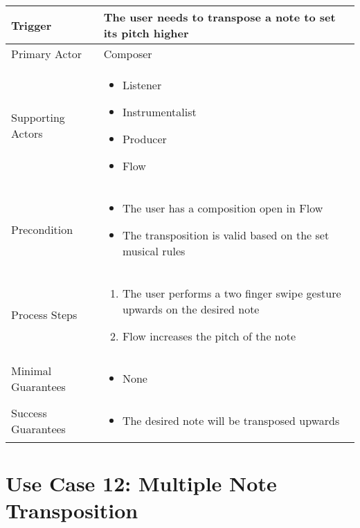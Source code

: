   \begin{tabularx}{\textwidth}{|X|X|}
  \hline
  Trigger & 
  The user needs to transpose a note to set its pitch higher \\
  \hline
  Primary Actor & 
  Composer \\
  \hline
  Supporting Actors & 
  \begin{itemize}
  \item Listener
  \item Instrumentalist
  \item Producer
  \item Flow
  \end{itemize} \\
  \hline
  Precondition & 
  \begin{itemize}
  \item The user has a composition open in Flow
  \item The transposition is valid based on the set musical rules
  \end{itemize} \\
  \hline
  Process Steps & 
  \begin{enumerate}
  \item The user performs a two finger swipe gesture upwards on the desired note
  \item Flow increases the pitch of the note
  \end{enumerate} \\
  \hline
  Minimal Guarantees & 
  \begin{itemize}
    \item None
  \end{itemize} \\
  \hline
  Success Guarantees & 
  \begin{itemize}
    \item The desired note will be transposed upwards
  \end{itemize} \\
  \hline
  \end{tabularx}

  \section{Use Case 12: Multiple Note Transposition}

